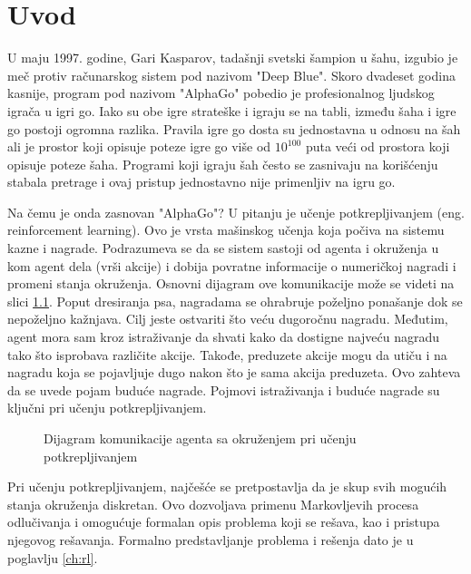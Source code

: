 \chapter{Uvod}



U maju 1997. godine, Gari Kasparov, tadašnji svetski šampion u šahu, izgubio je meč protiv računarskog sistem pod nazivom "Deep Blue". Skoro dvadeset godina kasnije, program pod nazivom "AlphaGo" pobedio je profesionalnog ljudskog igrača u igri go. Iako su obe igre strateške i igraju se na tabli, između šaha i igre go postoji ogromna razlika. Pravila igre go dosta su jednostavna u odnosu na šah ali je prostor koji opisuje poteze igre go više od $10^{100}$ puta veći od prostora koji opisuje poteze šaha. Programi koji igraju šah često se zasnivaju na korišćenju stabala pretrage i ovaj pristup jednostavno nije primenljiv na igru go. \par

Na čemu je onda zasnovan "AlphaGo"? U pitanju je učenje potkrepljivanjem (eng. reinforcement learning). Ovo je vrsta mašinskog učenja koja počiva na sistemu kazne i nagrade. Podrazumeva se da se sistem sastoji od agenta i okruženja u kom agent dela (vrši akcije) i dobija povratne informacije o numeričkoj nagradi i promeni stanja okruženja. Osnovni dijagram ove komunikacije može se videti na slici \ref{fig:rl_diag}. Poput dresiranja psa, nagradama se ohrabruje poželjno ponašanje dok se nepoželjno kažnjava. Cilj jeste ostvariti što veću dugoročnu nagradu. Međutim, agent mora sam kroz istraživanje da shvati kako da dostigne najveću nagradu tako što isprobava različite akcije. Takođe, preduzete akcije mogu da utiču i na nagradu koja se pojavljuje dugo nakon što je sama akcija preduzeta. Ovo zahteva da se uvede pojam buduće nagrade. Pojmovi istraživanja i buduće nagrade su ključni pri učenju potkrepljivanjem. 

\begin{figure}
	\centering
	\resizebox{.4\linewidth}{!}{}
	\caption{Dijagram komunikacije agenta sa okruženjem pri učenju potkrepljivanjem}
	\label{fig:rl_diag}
\end{figure}

\par
Pri učenju potkrepljivanjem, najčešće se pretpostavlja da je skup svih mogućih stanja okruženja diskretan. Ovo dozvoljava primenu Markovljevih procesa odlučivanja i omogućuje formalan opis problema koji se rešava, kao i pristupa njegovog rešavanja. Formalno predstavljanje problema i rešenja dato je u poglavlju \ref{ch:rl}.

